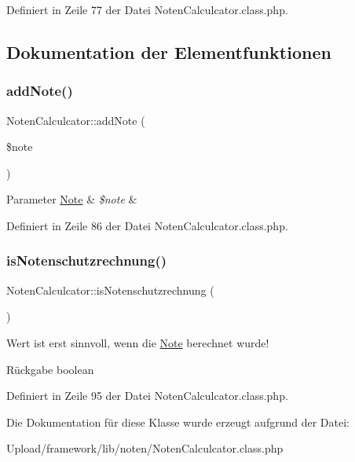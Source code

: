 Definiert in Zeile 77 der Datei Noten\+Calculcator.\+class.\+php.



\subsection{Dokumentation der Elementfunktionen}
\mbox{\label{class_noten_calculcator_a8e3ba962241c29afe3f7e45d8879eefc}} 
\subsubsection{\texorpdfstring{add\+Note()}{addNote()}}
{\footnotesize\ttfamily Noten\+Calculcator\+::add\+Note (\begin{DoxyParamCaption}\item[{}]{\$note }\end{DoxyParamCaption})}


\begin{DoxyParams}[1]{Parameter}
\mbox{\hyperlink{class_note}{Note}} & {\em \$note} & \\
\hline
\end{DoxyParams}


Definiert in Zeile 86 der Datei Noten\+Calculcator.\+class.\+php.

\mbox{\label{class_noten_calculcator_a0b1296c8095351beaf397356c0061c3d}} 
\subsubsection{\texorpdfstring{is\+Notenschutzrechnung()}{isNotenschutzrechnung()}}
{\footnotesize\ttfamily Noten\+Calculcator\+::is\+Notenschutzrechnung (\begin{DoxyParamCaption}{ }\end{DoxyParamCaption})}

Wert ist erst sinnvoll, wenn die \mbox{\hyperlink{class_note}{Note}} berechnet wurde! \begin{DoxyReturn}{Rückgabe}
boolean 
\end{DoxyReturn}


Definiert in Zeile 95 der Datei Noten\+Calculcator.\+class.\+php.



Die Dokumentation für diese Klasse wurde erzeugt aufgrund der Datei\+:\begin{DoxyCompactItemize}
\item 
Upload/framework/lib/noten/Noten\+Calculcator.\+class.\+php\end{DoxyCompactItemize}
